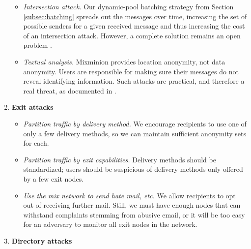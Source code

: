 \documentclass[times,10pt,twocolumn]{article}
\begin{document}
\begin{enumerate}
\begin{itemize}
\item \emph{Intersection attack.} Our dynamic-pool batching strategy
from Section \ref{subsec:batching} spreads out the messages over time,
increasing the set of possible senders for a given received message and
thus increasing the cost of an intersection attack. However, a complete
solution remains an open problem \cite{langos02}.
\item \emph{Textual analysis.} Mixminion provides location anonymity,
not data anonymity. Users are responsible for making sure their messages
do not reveal identifying information. Such attacks are practical, and
therefore a real threat, as documented in \cite{rao-pseudonymity}.
\end{itemize}

\item \textbf{Exit attacks}

\begin{itemize}
\item \emph{Partition traffic by delivery method.} We encourage recipients
to use one of only a few delivery methods, so we can maintain sufficient
anonymity sets for each.
\item \emph{Partition traffic by exit capabilities.}
Delivery methods should be standardized; users should be suspicious of
delivery methods only offered by a few exit nodes.
\item \emph{Use the mix network to send hate mail, etc.} We allow
recipients to opt out of receiving further mail.  Still, we must have
enough nodes that can withstand complaints stemming from abusive
email, or it will be too easy for an adversary to monitor all exit nodes in
the network.
\end{itemize}

\item \textbf{Directory attacks}


\end{enumerate}
\end{document}
